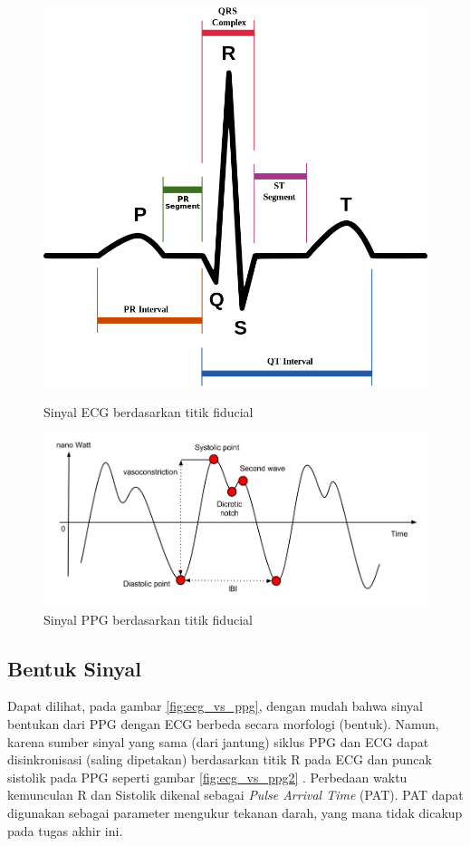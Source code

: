 \begin{figure}[H]
    \centering
    \includegraphics[scale=0.2]{images/ecg_points.png}
    \caption{Sinyal ECG berdasarkan titik fiducial}
    \label{fig:ecg_points}
	\includegraphics[scale=0.3]{images/PPG2.png}
    \caption{Sinyal PPG berdasarkan titik fiducial}
    \label{fig:ppg_points}
\end{figure}


\subsection{Bentuk Sinyal}
Dapat dilihat, pada gambar \ref{fig:ecg_vs_ppg}, dengan mudah bahwa sinyal bentukan dari PPG dengan ECG berbeda secara morfologi (bentuk)\cite{ppg_vs_ecg}. Namun, karena sumber sinyal yang sama (dari jantung) siklus PPG dan ECG dapat disinkronisasi (saling dipetakan) berdasarkan titik R pada ECG dan puncak sistolik pada PPG seperti gambar \ref{fig:ecg_vs_ppg2} \cite{ecg_syncro}. Perbedaan waktu kemunculan R dan Sistolik dikenal sebagai \textit{Pulse Arrival Time} (PAT). PAT dapat digunakan sebagai parameter mengukur tekanan darah, yang mana tidak dicakup pada tugas akhir ini.

